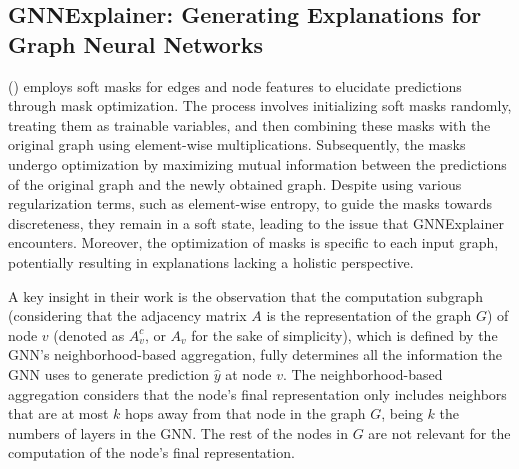\documentclass[binding=0.6cm]{sapthesis}
\newcommand{\mycite}[1]{(\cite{#1})}
\begin{document}
\subsection{GNNExplainer: Generating Explanations
for Graph Neural Networks} 
\label{sec:cfpg.bg.gnnexplainer}
\mycite{ying2019-gnnexplainer} employs soft masks for edges and node features to elucidate predictions through mask optimization. The process involves initializing soft masks randomly, treating them as trainable variables, and then combining these masks with the original graph using element-wise multiplications. Subsequently, the masks undergo optimization by maximizing mutual information between the predictions of the original graph and the newly obtained graph. Despite using various regularization terms, such as element-wise entropy, to guide the masks towards discreteness, they remain in a soft state, leading to the  issue that GNNExplainer encounters. Moreover, the optimization of masks is specific to each input graph, potentially resulting in explanations lacking a holistic perspective.

A key insight in their work is the observation that the computation subgraph (considering that the adjacency matrix $A$ is the representation of the graph $G$) of node $v$ (denoted as $A_v^c$, or $A_v$ for the sake of simplicity), which is defined by the GNN’s neighborhood-based aggregation, fully determines all the information the GNN uses to generate prediction $\hat y$ at node $v$. The neighborhood-based aggregation considers that the node’s final representation only includes neighbors that are at most $k$ hops away from that node in the graph $G$, being $k$ the numbers of layers in the GNN. The rest of the nodes in $G$ are not relevant for the computation of the node’s final representation.
\end{document}
